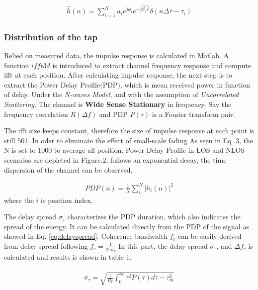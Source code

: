 \documentclass[a4paper]{article}
\begin{document}
	\begin{align} 
		\begin{split}
			\hat{h}(n) = \sum_{i=1}^{N} a_i e^{j\phi_i}e^{-j\vec{\beta_i}\vec{r}}\delta(n\Delta\tau-\tau_i)
		\end{split}
		\label{eq:wide0}
	\end{align}
	
	\subsubsection{Distribution of the tap}
	\noindent
	Relied on measured data, the impulse response is calculated in Matlab. A function $ifft3d$ is introduced to extract channel frequency response and compute ifft at each position. After calculating impulse response, the next step is to extract the Power Delay Profile$($PDP$)$, which is mean received power in function of delay. Under the \textit{N-waves Model}, and with the assumption of \textit{Uncorrelated Scattering}. The channel is \textbf{Wide Sense Stationary} in frequency. Say the frequency correlation $R(\Delta f)$ and PDP $P(\tau)$ is a Fourier transform pair.
	
	The ifft size keeps constant, therefore the size of impulse response at each point is still 501. In oder to eliminate the effect of small-scale fading As seen in Eq .3,  the N is set to 1000 to average all position. Power Delay Profile in LOS and NLOS scenarios are depicted in Figure.2, follows an exponential decay, the time dispersion of the channel can be observed.
	
	\begin{align} 
		PDP(n)=\frac{1}{N}\sum_i^N|h_i(n)|^{2}
	\end{align}
	where the $i$ is position index.
	
	The delay spread $\sigma_\tau$ characterizes the PDP duration, which also indicates the spread of the energy. It can be calculated directly from the PDP of the signal as showed in Eq. \ref{eq:delayspread}. Coherence bandwidth $f_c$ can be easily derived from delay spread following $f_c = \frac{1}{2 \pi \sigma_\tau}$ In this part, the delay spread $\sigma_\tau$, and ${\Delta}f_c$ is calculated and results is shown in table 1. 
    
    \begin{align} 
		\begin{split}
			\sigma_\tau = \sqrt{\frac{1}{P_T}\int_0^{\infty} \tau^2P(\tau)d\tau - \tau_m^2 }
		\end{split}
		\label{eq:delayspread}
	\end{align}
	
\end{document}
